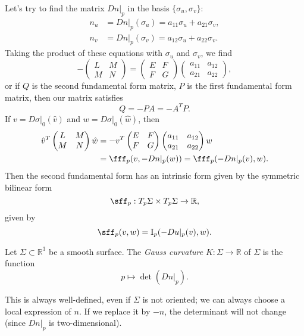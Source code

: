 \documentclass[12pt]{article}
\begin{document}
Let's try to find the matrix $Dn|_p$ in the basis $\{\sigma_u, \sigma_v\}$:
\begin{align*}
	n_u &= Dn|_p(\sigma_u) = a_{11} \sigma_u + a_{21} \sigma_v, \\
	n_v &= Dn|_p(\sigma_v) = a_{12} \sigma_u + a_{22} \sigma_v.
\end{align*}
Taking the product of these equations with $\sigma_u$ and $\sigma_v$, we find
\[
-
\begin{pmatrix}
	L & M \\
	M & N
\end{pmatrix}
=
\begin{pmatrix}
	E & F \\
	F & G
\end{pmatrix}
\begin{pmatrix}
	a_{11} & a_{12} \\
	a_{21} & a_{22}
\end{pmatrix}
,\]
or if $Q$ is the second fundamental form matrix, $P$ is the first fundamental form matrix, then our matrix satisfies
\[
Q = -PA = -A^{T}P
.\]
If $v = D\sigma|_0(\hat v)$ and $w = D\sigma|_0(\hat w)$, then
\begin{align*}
	\hat v^{T}
	\begin{pmatrix}
		L & M \\
		M & N
	\end{pmatrix}
	\hat w &= - v^{T}
	\begin{pmatrix}
		E & F \\
		F & G
	\end{pmatrix}
	\begin{pmatrix}
		a_{11} & a_{12} \\
		a_{21} & a_{22}
	\end{pmatrix}
	w \\
	       &= \fff_p(v, -Dn|_p(w)) = \fff_p(-Dn|_p(v),w).
\end{align*}
Then the second fundamental form has an intrinsic form given by the symmetric bilinear form
\[
\sff_p : T_p \Sigma \times T_p \Sigma \to \mathbb{R}
,\]
given by
\[
	\sff_p(v, w) = \mathrm{I}_p(-Du|_p(v), w)
.\]
\begin{definition}
	Let $\Sigma \subset \mathbb{R}^3$ be a smooth surface. The \emph{Gauss curvature} $K : \Sigma \to \mathbb{R}$ of $\Sigma$ is the function
	\[
	p \mapsto \det(Dn|_p)
	.\]
\end{definition}

\begin{remark}
	This is always well-defined, even if $\Sigma$ is not oriented; we can always choose a local expression of $n$. If we replace it by $-n$, the determinant will not change (since $Dn|_p$ is two-dimensional).
\end{remark}
\end{document}
